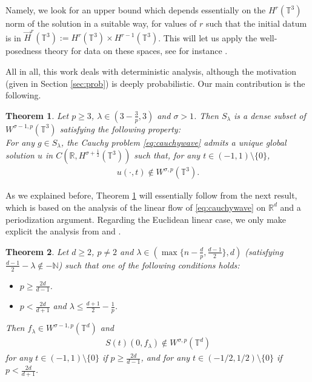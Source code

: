 \documentclass[a4paper, reqno, 11pt]{amsart}
\newtheorem{theorem}{Theorem}[section]
\theoremstyle{definition}
\begin{document}
	Namely, we look for an upper bound which depends essentially on the $H^r(\mathbb{T}^3)$ norm of the solution in a suitable way, for values of $r$ such that the initial datum is in $\vec{H}^r(\mathbb{T}^3) := H^r(\mathbb{T}^3) \times H^{r-1}(\mathbb{T}^3)$. This will let us apply the well-posedness theory for data on these spaces, see for instance \cite{Tzvetkov2019-notes}. 
	
All in all, this work deals with deterministic analysis, although the motivation (given in  Section \ref{sec:prob}) is deeply probabilistic. Our main contribution is the following.

\begin{theorem}\label{thm:nonpropag-nonlinear}
Let $p \geq 3$, $\lambda \in (3-\frac{3}{p},3)$ and $\sigma > 1$. Then $S_{\lambda}$ is a dense subset of $W^{\sigma-1,p}(\mathbb{T}^3)$ satisfying the following property:\\

For any $g \in S_{\lambda}$, the Cauchy problem \eqref{eq:cauchywave} admits a unique global solution $u$ in $C(\mathbb{R},H^{\sigma + \frac{1}{2}}(\mathbb{T}^3))$ such that, for any $t \in (-1,1) \setminus \{0\}$,
\begin{align*}
u(\cdot,t) \notin W^{\sigma,p}(\mathbb{T}^3).
\end{align*}
\end{theorem}
	
As we explained before, Theorem \ref{thm:nonpropag-nonlinear} will essentially follow from the next result, which is based on the analysis of the linear flow of \eqref{eq:cauchywave} on $\mathbb{R}^d$ and a periodization argument. Regarding the Euclidean linear case, we only make explicit the analysis from \cite{Peral1980} and \cite{Miyachi1980}.
	\begin{theorem}\label{thm:nonpropag-linear}
		Let $d \geq 2$, $p \neq 2$ and $\lambda \in (\max\{n-\frac{d}{p},\frac{d-1}{2}\},d)$ (satisfying $\frac{d-1}{2} - \lambda \notin - \mathbb{N}$) such that one of the following conditions holds:
\begin{itemize}
\item $p \geq \frac{2d}{d-1}$.
\item $p < \frac{2d}{d+1}$ and $\lambda \leq \frac{d+1}{2} - \frac{1}{p}$.  
\end{itemize}
Then $f_{\lambda} \in W^{\sigma-1,p}(\mathbb{T}^d)$ and
		\begin{align*}
			S(t)(0,f_{\lambda}) \notin W^{\sigma,p}(\mathbb{T}^d)
		\end{align*}
		for any $t \in (-1,1) \setminus \{0\}$ if $p \geq \frac{2d}{d-1}$, and for any $t \in (-1/2,1/2) \setminus \{0\}$ if $p < \frac{2d}{d+1}$.
	\end{theorem}
\end{document}
